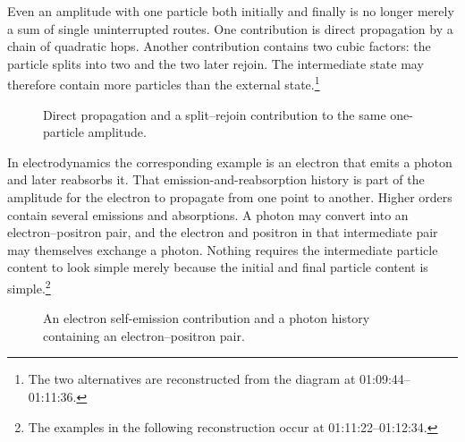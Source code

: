 Even an amplitude with one particle both initially and finally is no longer merely a sum of single uninterrupted routes. One contribution is direct propagation by a chain of quadratic hops. Another contribution contains two cubic factors: the particle splits into two and the two later rejoin. The intermediate state may therefore contain more particles than the external state.\footnote{The two alternatives are reconstructed from the diagram at 01:09:44--01:11:36.}

\begin{figure}[htbp]
\centering
{}
\caption{Direct propagation and a split--rejoin contribution to the same one-particle amplitude.}
\end{figure}

In electrodynamics the corresponding example is an electron that emits a photon and later reabsorbs it. That emission-and-reabsorption history is part of the amplitude for the electron to propagate from one point to another. Higher orders contain several emissions and absorptions. A photon may convert into an electron--positron pair, and the electron and positron in that intermediate pair may themselves exchange a photon. Nothing requires the intermediate particle content to look simple merely because the initial and final particle content is simple.\footnote{The examples in the following reconstruction occur at 01:11:22--01:12:34.}

\begin{figure}[htbp]
\centering
{}
\caption{An electron self-emission contribution and a photon history containing an electron--positron pair.}
\end{figure}

